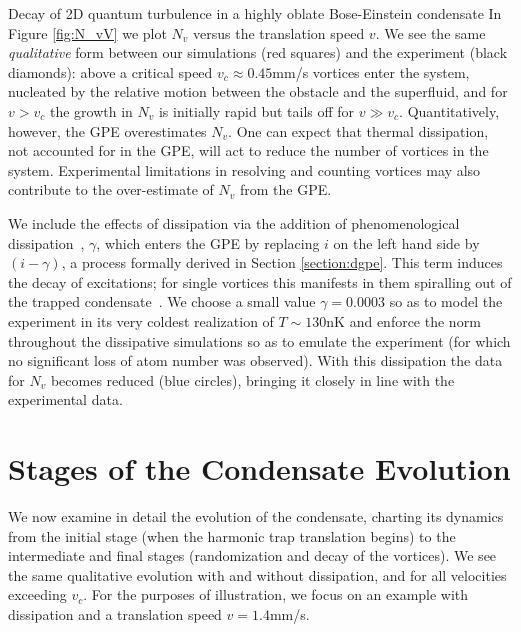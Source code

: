 \begin{chapter}{\label{cha:shin}Decay of 2D quantum turbulence in a highly oblate Bose-Einstein condensate}
In Figure \ref{fig:N_vV} we plot $N_v$ versus the translation speed $v$.  We see the same {\it qualitative} form between our simulations (red squares) and the experiment (black diamonds): above a critical speed $v_c \approx 0.45$mm/s vortices enter the system, nucleated by the relative motion between the obstacle and the superfluid, and for $v>v_c$ the growth in $N_v$ is initially rapid but tails off for $v\gg v_c$. Quantitatively, however, the GPE overestimates $N_v$.   One can expect that thermal dissipation, not accounted for in the GPE, will act to reduce the number of vortices in the system. Experimental limitations in resolving and counting vortices may also contribute to the over-estimate of $N_v$ from the GPE.

We include the effects of dissipation via the addition of phenomenological dissipation~\citep{choi_morgan_98,tsubota_kasamatsu_02}, $\gamma$, which enters the GPE by replacing $i$ on the left hand side by $(i-\gamma)$, a process formally derived in Section \ref{section:dgpe}.  This term induces the decay of excitations; for single vortices this manifests in them spiralling out of the trapped condensate~\citep{madarassy_barenghi_08,jackson_proukakis_09,allen_zaremba_13,yan_proukakis_14}. We choose a small value $\gamma = 0.0003$ so as to model the experiment in its very coldest realization of $T\sim130$nK and enforce the norm throughout the dissipative simulations so as to emulate the experiment (for which no significant loss of atom number was observed). With this dissipation the data for $N_v$ becomes reduced (blue circles), bringing it closely in line with the experimental data.

\section{Stages of the Condensate Evolution}

We now examine in detail the evolution of the condensate, 
charting its dynamics from the initial stage (when the
harmonic trap translation begins) to the intermediate and final stages 
(randomization and decay of the vortices).  We see the same 
qualitative evolution with and without dissipation, and for all 
velocities exceeding $v_c$.  For the purposes of illustration, 
we focus on an example with dissipation and a translation 
speed $v=1.4$mm/s. 


\end{chapter}
